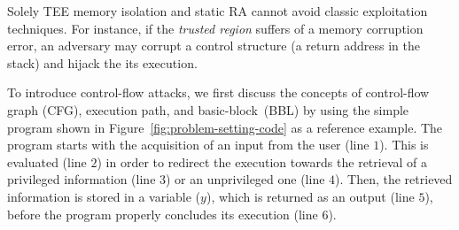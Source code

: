Solely TEE memory isolation and static RA cannot avoid classic exploitation 
techniques.
For instance, if the \emph{trusted region} suffers of a memory corruption 
error, an adversary may corrupt a control structure (\ie a return address in 
the stack) and hijack the its execution.

To introduce control-flow attacks, we first discuss the concepts of 
control-flow graph (CFG), execution path, and basic-block~(BBL) by using the 
simple program shown in Figure~\ref{fig:problem-setting-code} as a reference 
example. 
The program starts with the acquisition of an input from the user (line $1$). 
This is evaluated (line $2$) in order to redirect the execution towards the 
retrieval of a privileged information (line $3$) or an unprivileged one (line 
$4$). Then, the retrieved information is stored in a variable ($y$), which is 
returned as an output (line $5$), before the program properly concludes its 
execution (line $6$). 

